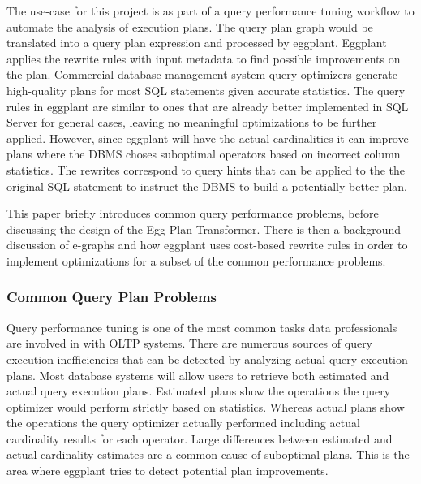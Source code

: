 \documentclass{article}
\begin{document}
The use-case for this project is as part of a query performance tuning workflow to
automate the analysis of execution plans.  The query plan graph would be translated into a
query plan expression and processed by eggplant.  Eggplant applies the rewrite rules with input metadata to
find possible improvements on the plan.  Commercial database management system query optimizers generate 
high-quality plans for most SQL statements given accurate statistics.  The query rules in eggplant are similar 
to ones that are already better implemented in SQL Server for general cases, leaving no meaningful optimizations 
to be further applied.  However, since eggplant will have the actual cardinalities it can improve plans where 
the DBMS choses suboptimal operators based on incorrect column statistics.  The rewrites correspond to 
query hints that can be applied to the the original SQL statement to instruct the DBMS to build a potentially better plan.  

This paper briefly introduces common query performance problems, before discussing the design of the Egg Plan
Transformer.  There is then a background discussion of e-graphs and how eggplant uses cost-based rewrite 
rules in order to implement optimizations for a subset of the common performance problems.

\subsubsection*{Common Query Plan Problems}
Query performance tuning is one of the most common tasks data professionals are involved in with OLTP
systems. \cite{BenGan:2015}  There are numerous sources of query execution inefficiencies that
can be detected by analyzing actual query execution plans.  Most database systems will allow users 
to retrieve both estimated and actual query execution plans.  Estimated plans show the operations the query
optimizer would perform strictly based on statistics.  Whereas actual plans show the operations the 
query optimizer actually performed including actual cardinality results for each operator.  Large
differences between estimated and actual cardinality estimates are a common cause of suboptimal plans.
This is the area where eggplant tries to detect potential plan improvements.
\end{document}
